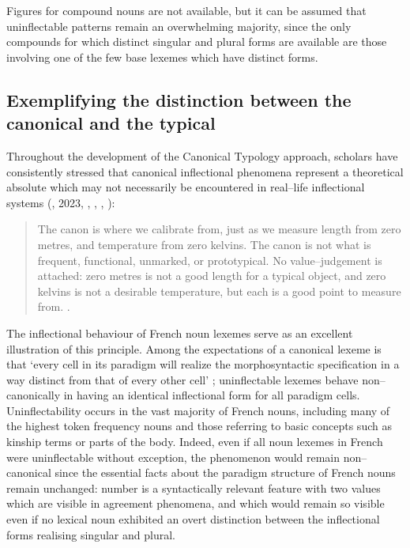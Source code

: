 \documentclass[output=paper]{langscibook}
\begin{document}
Figures for compound nouns are not available, but it can be assumed that uninflectable patterns remain an overwhelming majority, since the only compounds for which distinct singular and plural forms are available are those involving one of the few base lexemes which have distinct forms. 

\subsection{Exemplifying the distinction between the canonical and the typical} %

Throughout the development of the Canonical Typology approach, scholars have consistently stressed that canonical inflectional phenomena represent a theoretical absolute which may not necessarily be encountered in real–life inflectional systems (\citealt{Corbett2007,Corbett2009}, 2023, \citealt{BrownChumakina2013}, \citealt{CorbettFedden2016}, \citealt{Audring2019}, \citealt{Bond2019}):

\begin{quote}
The canon is where we calibrate from, just as we measure length from zero metres, and temperature from zero kelvins. The canon is not what is frequent, functional, unmarked, or prototypical. No value–judgement is attached: zero metres is not a good length for a typical object, and zero kelvins is not a desirable temperature, but each is a good point to measure from. \citep[188]{Corbett2023}.
\end{quote}

The inflectional behaviour of French noun lexemes serve as an excellent illustration of this principle. Among the expectations of a canonical lexeme is that ‘every cell in its paradigm will realize the morphosyntactic specification in a way distinct from that of every other cell’ \citep[2]{Corbett2009}; uninflectable lexemes behave non–canonically in having an identical inflectional form for all paradigm cells. Uninflectability occurs in the vast majority of French nouns, including many of the highest token frequency nouns and those referring to basic concepts such as kinship terms or parts of the body. Indeed, even if all noun lexemes in French were uninflectable without exception, the phenomenon would remain non–canonical since the essential facts about the paradigm structure of French nouns remain unchanged: number is a syntactically relevant feature with two values which are visible in agreement phenomena, and which would remain so visible even if no lexical noun exhibited an overt distinction between the inflectional forms realising singular and plural.
\end{document}
